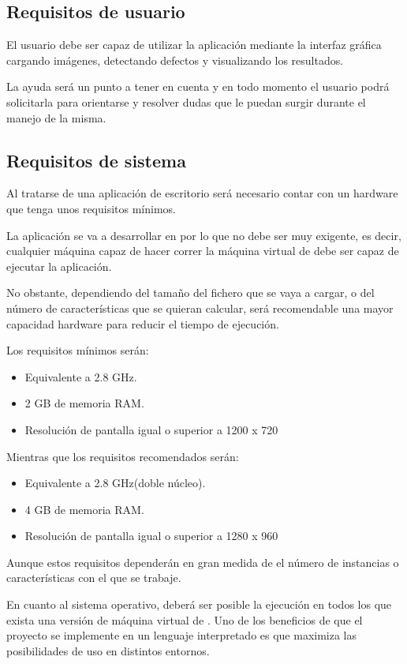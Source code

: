 \subsection{Requisitos de usuario}
El usuario debe ser capaz de utilizar la aplicación mediante la interfaz gráfica cargando imágenes, detectando defectos y visualizando los resultados.

La ayuda será un punto a tener en cuenta y en todo momento el usuario podrá solicitarla para orientarse y resolver dudas que le puedan surgir durante el manejo de la misma.


\subsection{Requisitos de sistema}
Al tratarse de una aplicación de escritorio será necesario contar con un hardware que tenga unos requisitos mínimos.

La aplicación se va a desarrollar en \java{} por lo que no debe ser muy exigente, es decir, cualquier máquina capaz de hacer correr la máquina virtual de \java{} debe ser capaz de ejecutar la aplicación.

No obstante, dependiendo del tamaño del fichero \arff{} que se vaya a cargar, o del número de características que se quieran calcular, será recomendable una mayor capacidad hardware para reducir el tiempo de ejecución.

Los requisitos mínimos serán:
\begin{itemize}
 \item Equivalente a 2.8 GHz.
 \item 2 GB de memoria RAM.
 \item Resolución de pantalla igual o superior a 1200 x 720
\end{itemize}

Mientras que los requisitos recomendados serán:
\begin{itemize}
 \item Equivalente a 2.8 GHz(doble núcleo).
 \item 4 GB de memoria RAM.
 \item Resolución de pantalla igual o superior a 1280 x 960
\end{itemize}

Aunque estos requisitos dependerán en gran medida de el número de instancias o características con el que se trabaje.

En cuanto al sistema operativo, deberá ser posible la ejecución en todos los que exista una versión de máquina virtual de \java{}. Uno de los beneficios de que el proyecto se implemente en un lenguaje interpretado es que maximiza las posibilidades de uso en distintos entornos.

